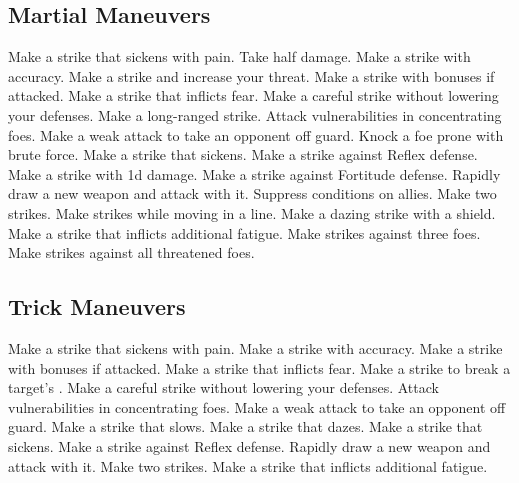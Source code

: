 \subsection{Martial Maneuvers}\label{Martial Maneuvers}
\begin{spelllist}
 Make a strike that sickens with pain.
 Take half damage.
 Make a strike with  accuracy.
 Make a strike and increase your threat.
 Make a strike with bonuses if attacked.
 Make a strike that inflicts fear.
 Make a careful strike without lowering your defenses.
 Make a long-ranged strike.
 Attack vulnerabilities in concentrating foes.
 Make a weak attack to take an opponent off guard.
 Knock a foe prone with brute force.
 Make a strike that sickens.
 Make a strike against Reflex defense.
 Make a strike with \plus1d damage.
 Make a strike against Fortitude defense.
 Rapidly draw a new weapon and attack with it.
 Suppress conditions on allies.
 Make two strikes.
 Make strikes while moving in a line.
 Make a dazing strike with a shield.
 Make a strike that inflicts additional fatigue.
 Make strikes against three foes.
 Make strikes against all threatened foes.
\end{spelllist}



\small
\subsection{Trick Maneuvers}\label{Trick Maneuvers}
\begin{spelllist}
 Make a strike that sickens with pain.
 Make a strike with  accuracy.
 Make a strike with bonuses if attacked.
 Make a strike that inflicts fear.
 Make a strike to break a target's .
 Make a careful strike without lowering your defenses.
 Attack vulnerabilities in concentrating foes.
 Make a weak attack to take an opponent off guard.
 Make a strike that slows.
 Make a strike that dazes.
 Make a strike that sickens.
 Make a strike against Reflex defense.
 Rapidly draw a new weapon and attack with it.
 Make two strikes.
 Make a strike that inflicts additional fatigue.
\end{spelllist}



